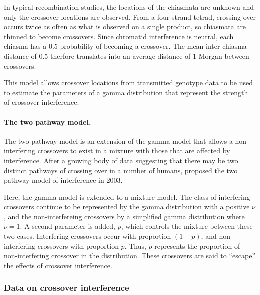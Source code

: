 In typical recombination studies, the locations of the chiasmata are unknown and only the crossover locations are observed.
From a four strand tetrad, crossing over occurs twice as often as what is observed on a single product, so chiasmata are thinned to become crossovers.
Since chromatid interference is neutral, each chiasma has a 0.5 probability of becoming a crossover.
The mean inter-chiasma distance of 0.5 therfore translates into an average distance of 1 Morgan between crossovers.

This model allows crossover locations from transmitted genotype data to be used to estimate the parameters of a gamma distribution that represent the strength of crossover interference.




\paragraph{The two pathway model.}

The two pathway model is an extension of the gamma model that allows a non-interfering crossovers to exist in a mixture with those that are affected by interference.
After a growing body of data suggesting that there may be two distinct pathways of crossing over in a number of humans, \citet{Housworth2003} proposed the two pathway model of interference in 2003.

Here, the gamma model is extended to a mixture model.
The class of interfering crossovers continue to be represented by the gamma distribution with a positive $\nu$, and the non-interfereing crossovers by a simplified gamma distribution where $\nu=$1.
A second parameter is added, $p$, which controls the mixture between these two cases.
Interfering crossovers occur with proportion $(1-p)$, and non-interfering crossovers with proportion $p$.
Thus, $p$ represents the proportion of non-interfering crossover in the distribution.
These crossovers are said to ``escape'' the effects of crossover interference.

\subsubsection{Data on crossover interference}

